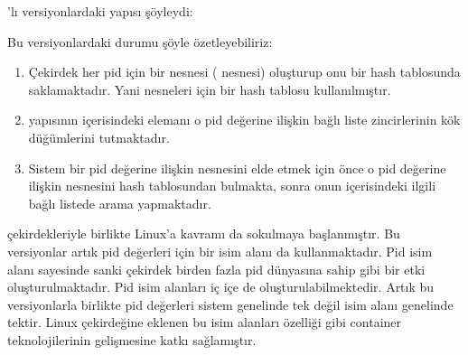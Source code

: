 \documentclass[a4paper,10pt,turkish]{sphinxmanual}
\begin{document}

’lı versiyonlardaki  yapısı şöyleydi:

\begin{sphinxVerbatim}[commandchars=\\\{\}]
\PYG{p}{[}\PYG{p}{]}
\PYG{p}{[}\PYG{p}{]}
\end{sphinxVerbatim}

\sphinxAtStartPar
Bu versiyonlardaki durumu şöyle özetleyebiliriz:
\begin{enumerate}
%
\item {} 
\sphinxAtStartPar
Çekirdek her pid için bir  nesnesi ( nesnesi) oluşturup onu bir hash
tablosunda saklamaktadır. Yani  nesneleri için bir hash tablosu kullanılmıştır.

\item {} 
\sphinxAtStartPar
{} yapısının içerisindeki  elemanı o pid değerine ilişkin bağlı liste zincirlerinin
kök düğümlerini tutmaktadır.

\item {} 
\sphinxAtStartPar
Sistem bir pid değerine ilişkin  nesnesini elde etmek için önce o pid değerine
ilişkin  nesnesini hash tablosundan bulmakta, sonra onun içerisindeki ilgili bağlı listede
arama yapmaktadır.

\end{enumerate}

 çekirdekleriyle birlikte Linux’a  kavramı da sokulmaya başlanmıştır.
Bu versiyonlar artık pid değerleri için bir isim alanı da kullanmaktadır. Pid isim alanı sayesinde
sanki çekirdek birden fazla pid dünyasına sahip gibi bir etki oluşturulmaktadır. Pid isim alanları iç
içe de oluşturulabilmektedir. Artık bu versiyonlarla birlikte pid değerleri sistem genelinde tek değil
isim alanı genelinde tektir. Linux çekirdeğine eklenen bu isim alanları özelliği  gibi container
teknolojilerinin gelişmesine katkı sağlamıştır.
\end{document}
